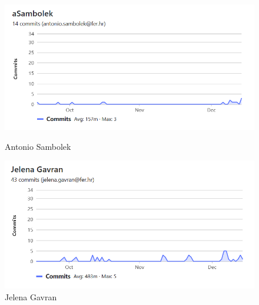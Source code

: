 		\begin{figure}[H]
			\begin{minipage}[t]{0.5\textwidth}
				\includegraphics[width=\linewidth]{slike/ASambolek.png}
				\caption{Antonio Sambolek} \label{fig:ASambolek}
			\end{minipage}
			\hspace*{\fill}
			\begin{minipage}[t]{0.5\textwidth}
				\includegraphics[width=\linewidth]{slike/JGavran.png}
				\caption{Jelena Gavran} \label{fig:Jgavran}
			\end{minipage}
		\end{figure}
		
